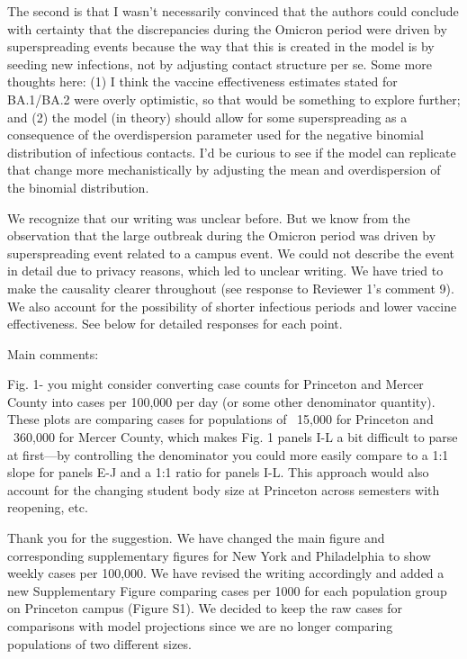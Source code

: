 \documentclass[12pt]{article}
\newcommand{\revtext}{\textsf}
\begin{document}
\revtext{The second is that I wasn’t necessarily convinced that the authors could conclude with certainty that the discrepancies during the Omicron period were driven by superspreading events because the way that this is created in the model is by seeding new infections, not by adjusting contact structure per se. Some more thoughts here: (1) I think the vaccine effectiveness estimates stated for BA.1/BA.2 were overly optimistic, so that would be something to explore further; and (2) the model (in theory) should allow for some superspreading as a consequence of the overdispersion parameter used for the negative binomial distribution of infectious contacts. I’d be curious to see if the model can replicate that change more mechanistically by adjusting the mean and overdispersion of the binomial distribution.} 

We recognize that our writing was unclear before.
But we know from the observation that the large outbreak during the Omicron period was driven by superspreading event related to a campus event.
We could not describe the event in detail due to privacy reasons, which led to unclear writing. 
We have tried to make the causality clearer throughout (see response to Reviewer 1's comment 9).
We also account for the possibility of shorter infectious periods and lower vaccine effectiveness.
See below for detailed responses for each point.

\revtext{Main comments:}

\revtext{Fig. 1- you might consider converting case counts for Princeton and Mercer County into cases per 100,000 per day (or some other denominator quantity). These plots are comparing cases for populations of ~15,000 for Princeton and ~360,000 for Mercer County, which makes Fig. 1 panels I-L a bit difficult to parse at first—by controlling the denominator you could more easily compare to a 1:1 slope for panels E-J and a 1:1 ratio for panels I-L. This approach would also account for the changing student body size at Princeton across semesters with reopening, etc.}

Thank you for the suggestion. 
We have changed the main figure and corresponding supplementary figures for New York and Philadelphia to show weekly cases per 100,000.
We have revised the writing accordingly and added a new Supplementary Figure comparing cases per 1000 for each population group on Princeton campus (Figure S1).
We decided to keep the raw cases for comparisons with model projections since we are no longer comparing populations of two different sizes.
\end{document}
